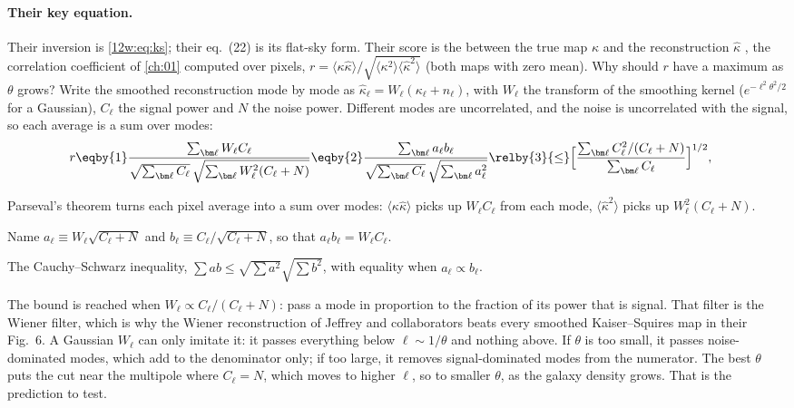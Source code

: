 \paragraph{Their key equation.} Their inversion is \eqref{12w:eq:ks}; their eq.~(22) is its flat-sky form. Their
score is the  between the true map $\kappa$ and the reconstruction
$\hat\kappa$ \cite[eq.~35]{Jeffrey2021DESmass}, the correlation coefficient of \cref{ch:01} computed over pixels,
$r=\langle\kappa\hat\kappa\rangle/\sqrt{\langle\kappa^2\rangle\langle\hat\kappa^2\rangle}$ (both maps with zero
mean). Why should $r$ have a maximum as $\theta$ grows? Write the smoothed reconstruction mode by mode as
$\hat\kappa_{\bm\ell}=W_\ell(\kappa_{\bm\ell}+n_{\bm\ell})$, with $W_\ell$ the transform of the smoothing kernel
($e^{-\ell^2\theta^2/2}$ for a Gaussian), $C_\ell$ the signal power and $N$ the noise power. Different modes are
uncorrelated, and the noise is uncorrelated with the signal, so each average is a sum over modes:
\begin{align}
r
&\eqby{1}\frac{\sum_{\bm\ell}W_\ell C_\ell}{\sqrt{\sum_{\bm\ell}C_\ell}\,\sqrt{\sum_{\bm\ell}W_\ell^2(C_\ell+N)}}
\eqby{2}\frac{\sum_{\bm\ell}a_\ell b_\ell}{\sqrt{\sum_{\bm\ell}C_\ell}\,\sqrt{\sum_{\bm\ell}a_\ell^2}}
\relby{3}{\le}\Bigl[\frac{\sum_{\bm\ell}C_\ell^2/(C_\ell+N)}{\sum_{\bm\ell}C_\ell}\Bigr]^{1/2},
\label{12w:eq:pearson}
\end{align}
\begin{explain}
  \item Parseval's theorem turns each pixel average into a sum over modes: $\langle\kappa\hat\kappa\rangle$ picks up
        $W_\ell C_\ell$ from each mode, $\langle\hat\kappa^2\rangle$ picks up $W_\ell^2(C_\ell+N)$.
  \item Name $a_\ell\equiv W_\ell\sqrt{C_\ell+N}$ and $b_\ell\equiv C_\ell/\sqrt{C_\ell+N}$, so that $a_\ell b_\ell=
        W_\ell C_\ell$.
  \item The Cauchy--Schwarz inequality, $\sum ab\le\sqrt{\sum a^2}\sqrt{\sum b^2}$, with equality when $a_\ell\propto b_\ell$.
\end{explain}
The bound is reached when $W_\ell\propto C_\ell/(C_\ell+N)$: pass a mode in proportion to the fraction of its power
that is signal. That filter is the Wiener filter, which is why the Wiener reconstruction of Jeffrey and collaborators
beats every smoothed Kaiser--Squires map in their Fig.~6. A Gaussian $W_\ell$ can only imitate it: it passes
everything below $\ell\sim1/\theta$ and nothing above. If $\theta$ is too small, it passes noise-dominated modes,
which add to the denominator only; if too large, it removes signal-dominated modes from the numerator. The best
$\theta$ puts the cut near the multipole where $C_\ell=N$, which moves to higher $\ell$, so to smaller $\theta$, as
the galaxy density grows. That is the prediction to test.

